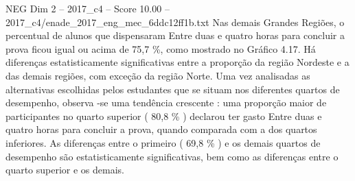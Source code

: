 \begin{textsample}{NEG Dim 2 – 2017\_c4 – Score 10.00 – 2017\_c4/enade\_2017\_eng\_mec\_6ddc12ff1b.txt}
Nas demais Grandes Regiões, o percentual de alunos que dispensaram Entre duas e quatro horas para concluir a prova ficou igual ou acima de 75,7 \%, como mostrado no Gráfico 4.17.
Há diferenças estatisticamente significativas entre a proporção da região Nordeste e a das demais regiões, com exceção da região Norte.
Uma vez analisadas as alternativas escolhidas pelos estudantes que se situam nos diferentes quartos de desempenho, observa -se uma tendência crescente : uma proporção maior de participantes no quarto superior ( 80,8 \% ) declarou ter gasto Entre duas e quatro horas para concluir a prova, quando comparada com a dos quartos inferiores.
As diferenças entre o primeiro ( 69,8 \% ) e os demais quartos de desempenho são estatisticamente significativas, bem como as diferenças entre o quarto superior e os demais.

\end{textsample}
